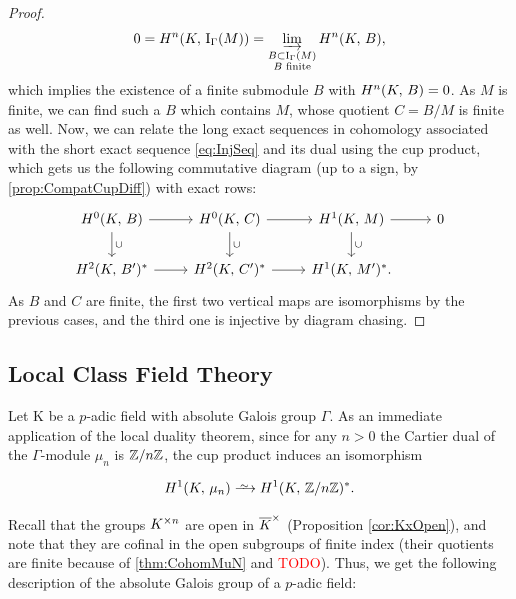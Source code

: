 \documentclass[a4paper, oneside]{memoir}
\begin{document}
\begin{proof}
    \[
        0=H^{n}( K, \, \mathrm{I}_{\Gamma}(M) )=\varinjlim_{\substack{B\subset\mathrm{I}_{\Gamma}(M) \\B\text{ finite}}}{H^{n}( K, \, B )},
    \]
    which implies the existence of a finite submodule \(B\) with \(H^{n}( K, \, B )=0\). As \(M\) is finite, we can find such a \(B\) which contains \(M\), whose quotient \(C=B/M\) is finite as well.
    Now, we can relate the long exact sequences in cohomology associated with the short exact sequence \eqref{eq:InjSeq}
    and its dual using the cup product, which gets us the following commutative diagram (up to a sign, by \ref{prop:CompatCupDiff}) with exact rows:
    \[
        \begin{tikzcd}
            \H{0}{\K}{B} \ar[r] \ar[d, "\cup"] & \H{0}{\K}{C} \ar[r] \ar[d, "\cup"] & \H{1}{\K}{M} \ar[d, "\cup"] \ar[r] & 0 \\
            \H{2}{\K}{B^\prime}^* \ar[r] & \H{2}{\K}{C^\prime}^* \ar[r] & \H{1}{\K}{M^\prime}^*.
        \end{tikzcd}
    \]
    As \(B\) and \(C\) are finite, the first two vertical maps are isomorphisms by the previous cases, and the third one is injective by diagram chasing.

\end{proof}


\subsection{Local Class Field Theory}

Let K be a $p$-adic field with absolute Galois group $\Gamma$. As an immediate application of the local duality theorem, since for any $n>0$ the Cartier dual of the $\Gamma$-module $\mu_n$ is $\mathbb{Z}/n\mathbb{Z}$, the cup product induces an isomorphism


\[
    \H{1}{K}{\mu_n} \Iso \H{1}{K}{\Zn}^*.
\]

Recall that the groups $K^{\times n}$ are open in $\overline{K}^\times$ (Proposition \ref{cor:KxOpen}), and note that they are cofinal in the open subgroups of finite index (their quotients are
finite because of \ref{thm:CohomMuN} and \textcolor{red}{TODO}). Thus, we get the following description of the absolute Galois group of a $p$-adic field:
\end{document}
